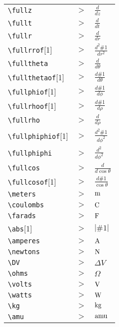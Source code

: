 \begin{tabular}{l l l}

\verb|\fullz| &$\gt$& ${\frac{d }{d z}}$\\[5pt] 
\verb|\fullt| &$\gt$& ${\frac{d }{d t}}$\\[5pt] 
\verb|\fullr| &$\gt$& ${\frac{d }{d r}}$\\[5pt] 
\verb|\fullrrof|[1] &$\gt$& ${\frac{d^2 \#1 }{d r^2}}$\\[5pt] 
\verb|\fulltheta| &$\gt$& ${\frac{d }{d\theta}}$\\[5pt] 
\verb|\fullthetaof|[1] &$\gt$& ${\frac{d \#1}{d\theta}}$\\[5pt] 
\verb|\fullphiof|[1] &$\gt$& ${\frac{d \#1}{d\phi}}$\\[5pt] 
\verb|\fullrhoof|[1] &$\gt$& ${\frac{d \#1}{d\rho}}$\\[5pt] 
\verb|\fullrho| &$\gt$& ${\frac{d }{d\rho}}$\\[5pt] 
\verb|\fullphiphiof|[1] &$\gt$& ${\frac{d^2 \#1}{d\phi^2}}$\\[5pt] 
\verb|\fullphiphi| &$\gt$& ${\frac{d^2 }{d\phi^2}}$\\[5pt] 
\verb|\fullcos| &$\gt$& ${\frac{d }{d\cos\theta}}$\\[5pt] 
\verb|\fullcosof|[1] &$\gt$& ${\frac{d \#1}{\cos\theta}}$\\[5pt] 
\verb|\meters| &$\gt$& ${\hbox{m}}$\\[5pt] 
\verb|\coulombs| &$\gt$& ${\hbox{C}}$\\[5pt] 
\verb|\farads| &$\gt$& ${\hbox{F}}$\\[5pt] 
\verb|\abs|[1] &$\gt$& ${| \#1 |}$\\[5pt] 
\verb|\amperes| &$\gt$& ${\hbox{A}}$\\[5pt] 
\verb|\newtons| &$\gt$& ${\hbox{N}}$\\[5pt] 
\verb|\DV| &$\gt$& ${\Delta V}$\\[5pt] 
\verb|\ohms| &$\gt$& ${\Omega}$\\[5pt] 
\verb|\volts| &$\gt$& ${\hbox{V}}$\\[5pt] 
\verb|\watts| &$\gt$& ${\hbox{W}}$\\[5pt] 
\verb|\kg| &$\gt$& ${\hbox{kg}}$\\[5pt] 
\verb|\amu| &$\gt$& ${\hbox{amu}}$\\[5pt] 
\end{tabular}

